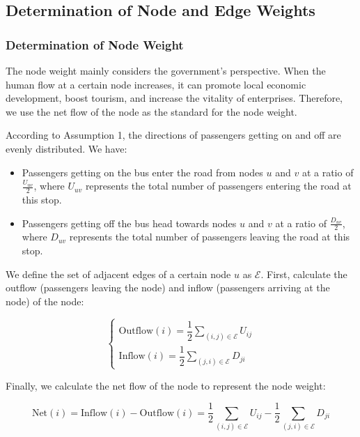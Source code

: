 \documentclass{mcmthesis}
\begin{document}
\subsection{Determination of Node and Edge Weights}

\subsubsection{Determination of Node Weight}

The node weight mainly considers the government's perspective. When the human flow at a certain node increases, it can promote local economic development, boost tourism, and increase the vitality of enterprises. Therefore, we use the net flow of the node as the standard for the node weight.

According to Assumption 1, the directions of passengers getting on and off are evenly distributed. We have:

\begin{itemize}
  \item Passengers getting on the bus enter the road from nodes \(u\) and \(v\) at a ratio of \(\frac{U_{uv}}{2}\), where \(U_{uv}\) represents the total number of passengers entering the road at this stop.
  \item Passengers getting off the bus head towards nodes \(u\) and \(v\) at a ratio of \(\frac{D_{uv}}{2}\), where \(D_{uv}\) represents the total number of passengers leaving the road at this stop.
\end{itemize}

We define the set of adjacent edges of a certain node \(u\) as \(\mathcal{E}\). First, calculate the outflow (passengers leaving the node) and inflow (passengers arriving at the node) of the node:

\begin{equation}
  \begin{cases} 
  \text{Outflow}(i)=\dfrac{1}{2}\sum_{(i, j)\in\mathcal{E}}U_{ij} \\
  \text{Inflow}(i)=\dfrac{1}{2}\sum_{(j, i)\in\mathcal{E}}D_{ji} 
  \end{cases}
\end{equation}

Finally, we calculate the net flow of the node to represent the node weight:

\begin{equation}
\text{Net}(i)=\text{Inflow}(i)-\text{Outflow}(i)=\frac{1}{2}\sum_{(i, j)\in\mathcal{E}}U_{ij}-\frac{1}{2}\sum_{(j, i)\in\mathcal{E}}D_{ji}
\end{equation}
\end{document}
